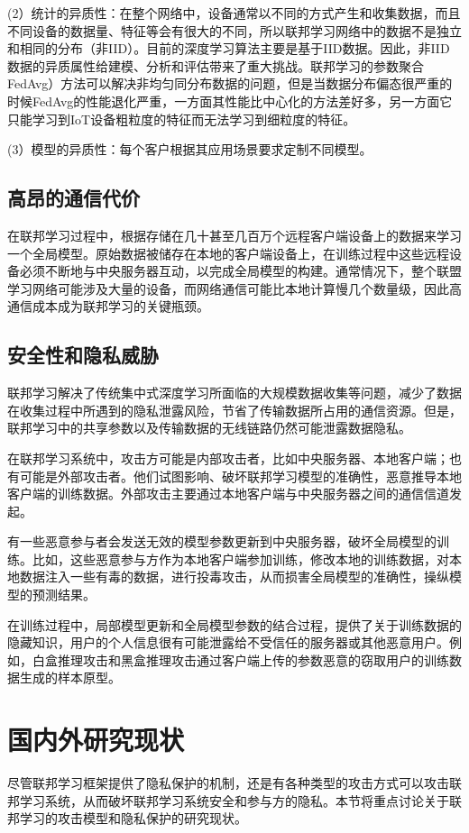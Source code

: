 (2）统计的异质性：在整个网络中，设备通常以不同的方式产生和收集数据，而且不同设备的数据量、特征等会有很大的不同，所以联邦学习网络中的数据不是独立和相同的分布（非IID）。目前的深度学习算法主要是基于IID数据。因此，非IID数据的异质属性给建模、分析和评估带来了重大挑战。联邦学习的参数聚合FedAvg）方法可以解决非均匀同分布数据的问题，但是当数据分布偏态很严重的时候FedAvg的性能退化严重，一方面其性能比中心化的方法差好多，另一方面它只能学习到IoT设备粗粒度的特征而无法学习到细粒度的特征。

(3）模型的异质性：每个客户根据其应用场景要求定制不同模型。

\subsection{高昂的通信代价}
在联邦学习过程中，根据存储在几十甚至几百万个远程客户端设备上的数据来学习一个全局模型。原始数据被储存在本地的客户端设备上，在训练过程中这些远程设备必须不断地与中央服务器互动，以完成全局模型的构建。通常情况下，整个联盟学习网络可能涉及大量的设备，而网络通信可能比本地计算慢几个数量级，因此高通信成本成为联邦学习的关键瓶颈。

\subsection{安全性和隐私威胁}
联邦学习解决了传统集中式深度学习所面临的大规模数据收集等问题，减少了数据在收集过程中所遇到的隐私泄露风险，节省了传输数据所占用的通信资源。但是，联邦学习中的共享参数以及传输数据的无线链路仍然可能泄露数据隐私。

在联邦学习系统中，攻击方可能是内部攻击者，比如中央服务器、本地客户端；也有可能是外部攻击者。他们试图影响、破坏联邦学习模型的准确性，恶意推导本地客户端的训练数据。外部攻击主要通过本地客户端与中央服务器之间的通信信道发起。

有一些恶意参与者会发送无效的模型参数更新到中央服务器，破坏全局模型的训练。比如，这些恶意参与方作为本地客户端参加训练，修改本地的训练数据，对本地数据注入一些有毒的数据，进行投毒攻击，从而损害全局模型的准确性，操纵模型的预测结果。

在训练过程中，局部模型更新和全局模型参数的结合过程，提供了关于训练数据的隐藏知识，用户的个人信息很有可能泄露给不受信任的服务器或其他恶意用户。例如，白盒推理攻击和黑盒推理攻击通过客户端上传的参数恶意的窃取用户的训练数据生成的样本原型。

\section{国内外研究现状}
尽管联邦学习框架提供了隐私保护的机制，还是有各种类型的攻击方式可以攻击联邦学习系统，从而破坏联邦学习系统安全和参与方的隐私。本节将重点讨论关于联邦学习的攻击模型和隐私保护的研究现状。

